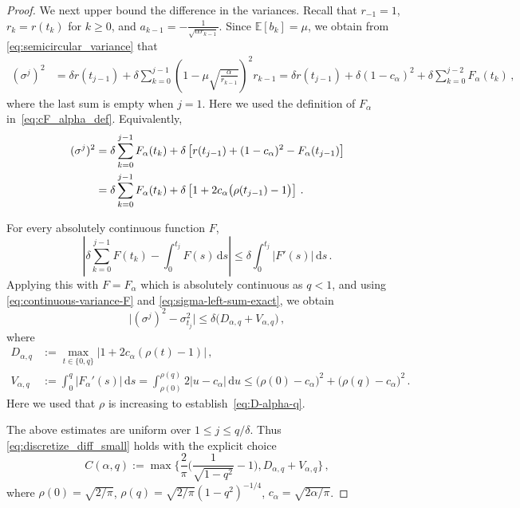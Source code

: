 \documentclass[11pt]{article}
\theoremstyle{definition}
\theoremstyle{remark}
\numberwithin{equation}{section}
\numberwithin{theorem}{section}
\newcommand{\E}{\mathbb E}
\newcommand{\rmd}{\mathrm{d}}
\begin{document}
\begin{proof}
We next upper bound the difference in the variances. Recall that
$r_{-1}=1$, $r_k=r(t_k)$ for $k\ge0$, and $a_{k-1}=-\frac1{\sqrt{\alpha r_{k-1}}}$. Since $\E[b_k]=\mu$, we obtain from \eqref{eq:semicircular_variance} that
\begin{align}
 (\sigma^j)^2
 &= 
 \delta r(t_{j-1}) + \delta \sum_{k=0}^{j-1} \left( 1 - \mu \sqrt{\frac{\alpha}{r_{k-1}}} \right)^2 r_{k-1}
 = \delta r(t_{j-1})
 {}+\delta(1-c_\alpha)^2
 {}+\delta\sum_{k=0}^{j-2}F_\alpha(t_k)\,,
 \label{eq:sigma-exact-lagged}
\end{align}
where the last sum is empty when $j=1$. Here we used the definition of $F_\alpha$ in~\eqref{eq:cF_alpha_def}. Equivalently,
\begin{align}
 (\sigma^j)^2
 &=
 \delta\sum_{k=0}^{j-1}F_\alpha(t_k)
 {}+\delta\left[
 r(t_{j-1})+(1-c_\alpha)^2-F_\alpha(t_{j-1})
 \right]\notag\\
 &=
 \delta\sum_{k=0}^{j-1}F_\alpha(t_k)
 {}+\delta\left[
 1+2c_\alpha\bigl(\rho(t_{j-1})-1\bigr)
 \right]\,.
 \label{eq:sigma-left-sum-exact}
\end{align}

For every absolutely continuous function $F$,
\[
 \left| \delta\sum_{k=0}^{j-1}F(t_k)-\int_0^{t_j}F(s)\,\rmd s
 \right|
 \le
 \delta\int_0^{t_j}|F'(s)|\,\rmd s\,.
\]
Applying this with $F=F_\alpha$ which is absolutely continuous as $q<1$, and using \eqref{eq:continuous-variance-F} and \eqref{eq:sigma-left-sum-exact}, we obtain
\begin{equation}\label{eq:sigma-discretization-explicit}
 \bigl|(\sigma^j)^2-\sigma_{t_j}^2\bigr|
 \le
 \delta\bigl(D_{\alpha,q}+V_{\alpha,q}\bigr)\,,
\end{equation}
where
\begin{align}
 D_{\alpha,q} &:= \max_{t\in\{0,q\}} \left|1+2c_\alpha(\rho(t)-1)\right|\,, \label{eq:D-alpha-q}\\
 V_{\alpha,q} &:= \int_0^q|F_\alpha'(s)|\,\rmd s = \int_{\rho(0)}^{\rho(q)}2|u-c_\alpha|\,\rmd u \le \bigl(\rho(0)-c_\alpha\bigr)^2{}+\bigl(\rho(q)-c_\alpha\bigr)^2\,.
 \label{eq:V-alpha-q}
\end{align}
Here we used that $\rho$ is increasing to establish~\eqref{eq:D-alpha-q}. 

The above estimates are uniform over $1\le j\le q/\delta$. Thus
\eqref{eq:discretize_diff_small} holds with the explicit choice
\begin{equation}\label{eq:discretization-constant}
 C(\alpha,q)
 :=
 \max\Big\{ \frac{2}{\pi} \Big(\frac1{\sqrt{1-q^2}}-1\Big), D_{\alpha,q}+V_{\alpha,q}\Big\}\,,
\end{equation}
where $\rho(0)=\sqrt{2/\pi}$, $\rho(q)=\sqrt{2/\pi}(1-q^2)^{-1/4}$, $c_\alpha=\sqrt{2\alpha/\pi}$.
\end{proof}
\end{document}
